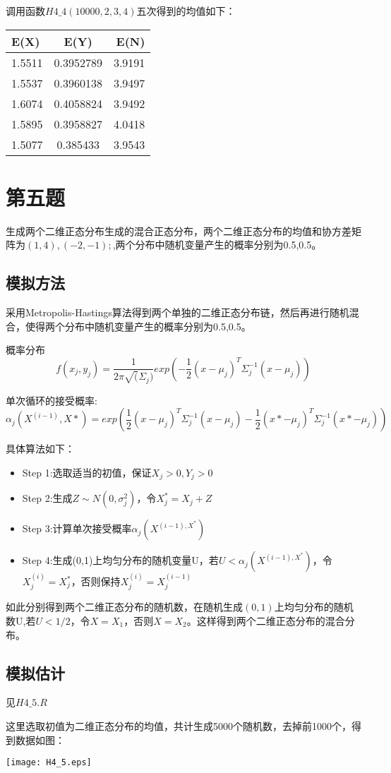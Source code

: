 \documentclass{ctexart}
\begin{document}
调用函数\(H4\_4(10000,2,3,4)\)五次得到的均值如下：

\begin{table}[h]
\centering
\begin{tabular}{| l | c | r | }
          \hline
          \bf E(X) & \bf E(Y) & \bf E(N) \\
          \hline
        1.5511 &0.3952789 &3.9191\\
          \hline
  1.5537 &0.3960138 &3.9497\\
          \hline
        1.6074 &0.4058824 &3.9492\\
          \hline
1.5895& 0.3958827 &4.0418\\
\hline
1.5077& 0.385433 & 3.9543\\
\hline
\end{tabular}
\end{table}

\section{第五题}

生成两个二维正态分布生成的混合正态分布，两个二维正态分布的均值和协方差矩阵为\((1,4),(-2,-1);\),两个分布中随机变量产生的概率分别为0.5,0.5。

\subsection{模拟方法}
采用Metropolis-Hastings算法得到两个单独的二维正态分布链，然后再进行随机混合，使得两个分布中随机变量产生的概率分别为0.5,0.5。

概率分布
\[f(x_j,y_j)=\frac{1}{2\pi \sqrt(\Sigma_j)}exp(-\frac{1}{2}(x-\mu_j)^T\Sigma_j^{-1}(x-\mu_j))\]

单次循环的接受概率:
\[\alpha_j(X^{(i-1)},X*)=exp(\frac{1}{2}(x-\mu_j)^T\Sigma_j^{-1}(x-\mu_j)-\frac{1}{2}(x*-\mu_j)^T\Sigma_j^{-1}(x*-\mu_j))
\]

具体算法如下：
\begin{itemize} 
\item Step 1:选取适当的初值，保证\(X_j>0,Y_j>0\)
\item Step 2:生成\(Z \sim N(0,\sigma_j^2)\)，令\(X_j^*=X_j+Z\)
\item Step 3:计算单次接受概率\(\alpha_j(X^{(i-1),X^*})\)
\item Step 4:生成(0,1)上均匀分布的随机变量U，若\(U<\alpha_j(X^{(i-1),X^*})\)，令\(X_j^{(i)}=X_j^*\)，否则保持\(X_j^{(i)}=X_j^{(i-1)}\)
\end{itemize}

如此分别得到两个二维正态分布的随机数，在随机生成\((0,1)\)上均匀分布的随机数U,若\(U<1/2\)，令\(X=X_1\)，否则\(X=X_2\)。这样得到两个二维正态分布的混合分布。

\subsection{模拟估计}

见\(H4\_5.R\)

这里选取初值为二维正态分布的均值，共计生成5000个随机数，去掉前1000个，得到数据如图：

\centerline{\texttt{[image: H4\_5.eps]}}
\end{document}
